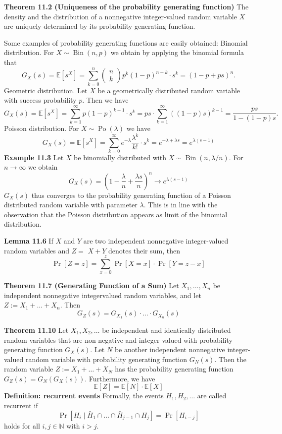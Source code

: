 \textbf{Theorem 11.2 (Uniqueness of the probability generating function)} The density and the distribution of a nonnegative integer-valued random variable $X$ are uniquely determined by its probability generating function.

Some examples of probability generating functions are easily obtained:
Binomial distribution.
For $X \sim \operatorname{Bin}(n, p)$ we obtain by applying the binomial formula that
$$
G_{X}(s)=\mathbb{E}\left[s^{X}\right]=\sum_{k=0}^{n}\left(\begin{array}{l}
n \\
k
\end{array}\right) p^{k}(1-p)^{n-k} \cdot s^{k}=(1-p+p s)^{n} .
$$
Geometric distribution.
Let $X$ be a geometrically distributed random variable with success probability $p$. Then we have
$$
G_{X}(s)=\mathbb{E}\left[s^{X}\right]=\sum_{k=1}^{\infty} p(1-p)^{k-1} \cdot s^{k}=p s \cdot \sum_{k=1}^{\infty}((1-p) s)^{k-1}=\frac{p s}{1-(1-p) s} .
$$
Poisson distribution.
For $X \sim \operatorname{Po}(\lambda)$ we have
$$
G_{X}(s)=\mathbb{E}\left[s^{X}\right]=\sum_{k=0}^{\infty} e^{-\lambda} \frac{\lambda^{k}}{k !} \cdot s^{k}=e^{-\lambda+\lambda s}=e^{\lambda(s-1)}
$$
\textbf{Example 11.3}  Let $X$ be binomially distributed with $X \sim \operatorname{Bin}(n, \lambda / n) .$ For $n \rightarrow \infty$ we obtain
$$
G_{X}(s)=\left(1-\frac{\lambda}{n}+\frac{\lambda s}{n}\right)^{n} \rightarrow e^{\lambda(s-1)}
$$
$G_{X}(s)$ thus converges to the probability generating function of a Poisson distributed random variable with parameter $\lambda$. This is in line with the observation that the Poisson distribution appears as limit of the binomial distribution.

\textbf{ Lemma 11.6} If $X$ and $Y$ are two independent nonnegative integer-valued random variables and $Z=$ $X+Y$ denotes their sum, then
$$
\operatorname{Pr}[Z=z]=\sum_{x=0}^{z} \operatorname{Pr}[X=x] \cdot \operatorname{Pr}[Y=z-x]
$$

\textbf{Theorem 11.7 (Generating Function of a Sum)} Let $X_{1}, \ldots, X_{n}$ be independent nonnegative integervalued random variables, and let $Z:=X_{1}+\ldots+X_{n}$. Then
$$
G_{Z}(s)=G_{X_{1}}(s) \cdot \ldots \cdot G_{X_{n}}(s)
$$

\textbf{Theorem 11.10 } Let $X_{1}, X_{2}, \ldots$ be independent and identically distributed random variables that are non-negative and integer-valued with probability generating function $G_{X}(s) .$ Let $N$ be another independent nonnegative integer-valued random variable with probability generating function $G_{N}(s) .$ Then the random variable $Z:=X_{1}+\ldots+X_{N}$ has the probability generating function $G_{Z}(s)=G_{N}\left(G_{X}(s)\right)$. Furthermore, we have
$$
\mathbb{E}[Z]=\mathbb{E}[N] \cdot \mathbb{E}[X]
$$
\textbf{Definition: recurrent events}
Formally, the events $H_{1}, H_{2}, \ldots$ are called recurrent if
$$
\operatorname{Pr}\left[H_{i} \mid \bar{H}_{1} \cap \ldots \cap \bar{H}_{j-1} \cap H_{j}\right]=\operatorname{Pr}\left[H_{i-j}\right]
$$
holds for all $i, j \in \mathbb{N}$ with $i>j$.

